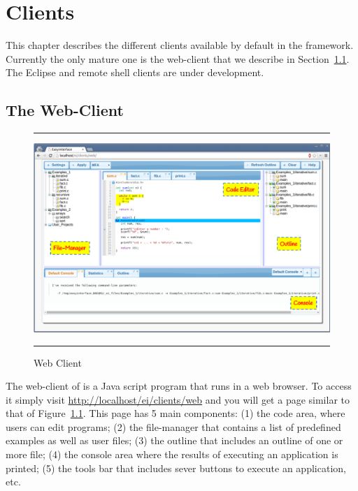 {%
}

\chapter{\ei Clients}
\label{ch:clients}

This chapter describes the different clients available by default in
the \ei framework. Currently the only mature one is the web-client
that we describe in Section~\ref{ch:clients:web}. The Eclipse and
remote shell clients are under development.

\section{The Web-Client}
\label{ch:clients:web}

\begin{figure}[h]
\hrule\smallskip
\begin{center}
\includegraphics[width=1\textwidth]{fig/webclient.pdf}
\end{center}
\caption{\ei Web Client}
\label{fig:webclient}
\hrule
\end{figure}

The web-client of \ei is a Java script program that runs in a web
browser. To access it simply visit
\url{http://localhost/ei/clients/web} and you will get a page similar
to that of Figure~\ref{fig:webclient}.
%
This page has 5 main components: (1) the code area, where users can
edit programs; (2) the file-manager that contains a list of predefined
examples as well as user files; (3) the outline that includes an
outline of one or more file; (4) the console area where the results of
executing an application is printed; (5) the tools bar that includes
sever buttons to execute an application, etc.

